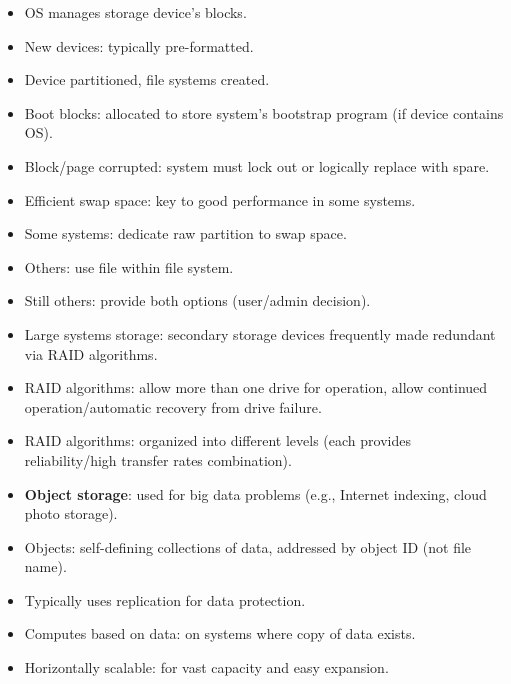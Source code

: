 \begin{itemize}
    \item OS manages storage device's blocks.
    \item New devices: typically pre-formatted.
    \item Device partitioned, file systems created.
    \item Boot blocks: allocated to store system's bootstrap program (if device contains OS).
    \item Block/page corrupted: system must lock out or logically replace with spare.
    \item Efficient swap space: key to good performance in some systems.
    \item Some systems: dedicate raw partition to swap space.
    \item Others: use file within file system.
    \item Still others: provide both options (user/admin decision).
    \item Large systems storage: secondary storage devices frequently made redundant via RAID algorithms.
    \item RAID algorithms: allow more than one drive for operation, allow continued operation/automatic recovery from drive failure.
    \item RAID algorithms: organized into different levels (each provides reliability/high transfer rates combination).
    \item \textbf{Object storage}: used for big data problems (e.g., Internet indexing, cloud photo storage).
    \item Objects: self-defining collections of data, addressed by object ID (not file name).
    \item Typically uses replication for data protection.
    \item Computes based on data: on systems where copy of data exists.
    \item Horizontally scalable: for vast capacity and easy expansion.
\end{itemize}
